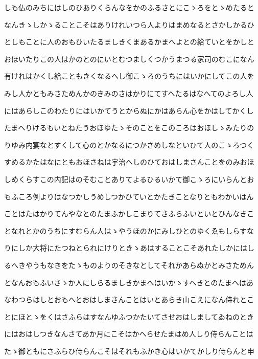 \documentclass[a4paper,11pt,landscape]{ltjtarticle}
\begin{document}
\par\medskip
しも仏のみちにはしのひありくらんなをかのふるさとにこゝろをとゝめたると
\par\medskip
なんきゝしかゝることこそはありけれいつら人よりはまめなるとさかしかるひ
\par\medskip
としもことに人のおもひいたるましきくまあるかまへよとの給ていとをかしと
\par\medskip
おほいたりこの人はかのとのにいとむつましくつかうまつる家司のむこになん
\par\medskip
有けれはかくし給こともきくなるへし御こゝろのうちにはいかにしてこの人を
\par\medskip
みし人かともみさためんかのきみのさはかりにてすへたるはなへてのよろし人
\par\medskip
にはあらしこのわたりにはいかてうとからぬにかはあらん心をかはしてかくし
\par\medskip
たまへりけるもいとねたうおほゆたゝそのことをこのころはおほしゝみたりの
\par\medskip
りゆみ内宴なとすくして心のとかなるにつかさめしなといひて人のこゝろつく
\par\medskip
すめるかたはなにともおほさねは宇治へしのひておはしまさんことをのみおほ
\par\medskip
しめくらすこの内記はのそむことありてよるひるいかて御こゝろにいらんとお
\par\medskip
もふころ例よりはなつかしうめしつかひていとかたきことなりともわかいはん
\par\medskip
ことはたはかりてんやなとのたまふかしこまりてさふらふいといとひんなきこ
\par\medskip
となれとかのうちにすむらん人はゝやうほのかにみしひとのゆくゑもしらすな
\par\medskip
りにしか大将にたつねとられにけりときゝあはすることこそあれたしかにはし
\par\medskip
るへきやうもなきをたゝものよりのそきなとしてそれかあらぬかとみさためん
\par\medskip
となんおもふいさゝか人にしらるましきかまへはいかゝすへきとのたまへはあ
\par\medskip
なわつらはしとおもへとおはしまさんことはいとあらき山こえになん侍れとこ
\par\medskip
とにほとゝをくはさふらはすなんゆふつかたいてさせおはしましてゐねのとき
\par\medskip
にはおはしつきなんさてあか月にこそはかへらせたまはめ人しり侍らんことは
\par\medskip
たゝ御ともにさふらひ侍らんこそはそれもふかき心はいかてかしり侍らんと申
\end{document}
